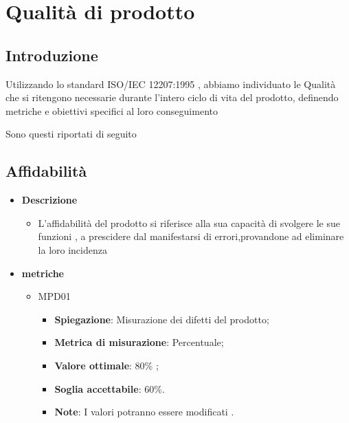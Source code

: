 \chapter{Qualità di prodotto}\label{qualita-di-prodotto}

\section{Introduzione}
Utilizzando lo standard ISO/IEC 12207:1995 , abbiamo individuato le Qualità che si ritengono necessarie durante l'intero ciclo di vita del prodotto, definendo metriche e obiettivi specifici al loro conseguimento

Sono questi riportati di seguito 

\section{Affidabilità}
\begin{itemize}
    \item \textbf{Descrizione}
    \begin{itemize}
        \item L'affidabilità del prodotto si riferisce alla sua capacità di svolgere le sue funzioni , a prescidere dal manifestarsi di errori,provandone ad eliminare la loro incidenza
    \end{itemize}
    
    \item \textbf{metriche}
    \begin{itemize}
        \item MPD01
        \begin{itemize}
            \item \textbf{Spiegazione}: Misurazione dei difetti del prodotto;
        \item \textbf{Metrica di misurazione}: Percentuale;
        \item \textbf{Valore ottimale}: 80\% ;
        \item \textbf{Soglia accettabile}: 60\%.
        \item \textbf{Note}: I valori potranno essere modificati .
        \end{itemize}
    \end{itemize}
    \end{itemize}


